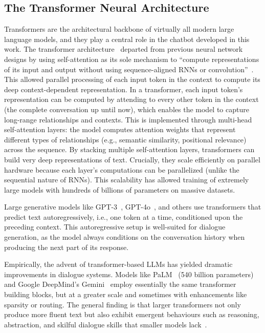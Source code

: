 \subsection*{The Transformer Neural Architecture}
\label{ssec:transformers}
Transformers are the architectural backbone of virtually all modern large language models, and they play a central role in the chatbot developed in this work. The transformer architecture~\cite{vaswani2017attention} departed from previous neural network designs by using self-attention as its sole mechanism to ``compute representations of its input and output without using sequence-aligned RNNs or convolution''~\cite{vaswani2017attention}. This allowed parallel processing of each input token in the context to compute its deep context-dependent representation. In a transformer, each input token's representation can be computed by attending to every other token in the context (the complete conversation up until now), which enables the model to capture long-range relationships and contexts. This is implemented through multi-head self-attention layers: the model computes attention weights that represent different types of relationships (e.g., semantic similarity, positional relevance) across the sequence. By stacking multiple self-attention layers, transformers can build very deep representations of text. Crucially, they scale efficiently on parallel hardware because each layer's computations can be parallelized (unlike the sequential nature of RNNs). This scalability has allowed training of extremely large models with hundreds of billions of parameters on massive datasets.


Large generative models like GPT-3~\cite{brown2020language}, GPT-4o~\cite{openai2023gpt4}, and others use transformers that predict text autoregressively, i.e., one token at a time, conditioned upon the preceding context. This autoregressive setup is well-suited for dialogue generation, as the model always conditions on the conversation history when producing the next part of its response.


Empirically, the advent of transformer-based LLMs has yielded dramatic improvements in dialogue systems. Models like PaLM~\cite{chowdhery2022palm} (540 billion parameters) and Google DeepMind's Gemini~\cite{comanici2025gemini25pushingfrontier} employ essentially the same transformer building blocks, but at a greater scale and sometimes with enhancements like sparsity or routing. The general finding is that larger transformers not only produce more fluent text but also exhibit emergent behaviours such as reasoning, abstraction, and skilful dialogue skills that smaller models lack~\cite{52065,berti2025emergentabilitieslargelanguage}.


